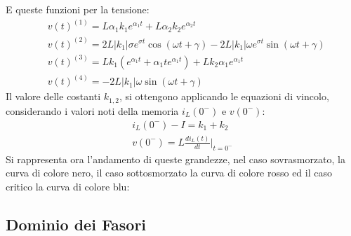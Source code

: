 \documentclass{article}
\numberwithin{equation}{subsection}
\begin{document}
E queste funzioni per la tensione:
\begin{align*}
    &v(t)^{(1)}=L\alpha_1k_1e^{\alpha_1t}+L\alpha_2k_2e^{\alpha_2t}\\
    &v(t)^{(2)}=2L|k_1|\sigma e^{\sigma t}\cos(\omega t+\gamma)-2L|k_1|\omega e^{\sigma t}\sin(\omega t+\gamma)\\
    &v(t)^{(3)}=Lk_1(e^{\alpha_1t}+\alpha_1te^{\alpha_1t})+Lk_2\alpha_1e^{\alpha_1t}\\
    &v(t)^{(4)}=-2L|k_1|\omega\sin(\omega t+\gamma)
\end{align*}
Il valore delle costanti $k_{1,2}$, si ottengono applicando le equazioni di vincolo, considerando i valori noti della memoria $i_L(0^-)$ e $v(0^-)$:
\begin{gather*}
    i_L(0^-)-I=k_1+k_2\\
    v(0^-)=L\displaystyle\frac{di_L(t)}{dt}\bigg|_{t={0^-}}
\end{gather*}
Si rappresenta ora l'andamento di queste grandezze, nel caso sovrasmorzato, la curva di colore nero, il caso sottosmorzato la curva di colore rosso ed il caso critico la curva 
di colore blu: 
\begin{center}
\end{center}
\begin{center}
\end{center}

\subsection{Dominio dei Fasori}
\end{document}
